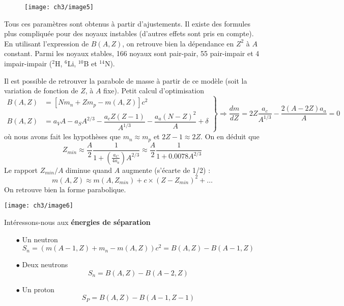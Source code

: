 	\begin{wrapfigure}[7]{l}{6cm}
	\vspace{-10mm}
	\texttt{[image: ch3/image5]}
	\end{wrapfigure}
Tous ces paramètres sont obtenus à partir d'ajustements. Il existe des formules plus compliquée pour des 
noyaux instables (d'autres effets sont pris en compte). En utilisant l'expression de $B(A,Z)$, on retrouve bien la dépendance en 
$Z^2$ à $A$ constant. Parmi les noyaux stables, 166 noyaux sont pair-pair, 55 pair-impair et 4 
impair-impair ($^2$H, $^6$Li, $^{10}$B et $^{14}$N).

\newpage
Il est possible de retrouver la parabole de masse à partir de ce modèle (soit la variation de fonction de $Z$, à
$A$ fixe). Petit calcul d'optimisation
\begin{equation}
\left.\begin{array}{ll}
B(A,Z) &= [Nm_n + Zm_p-m(A,Z)]c^2 \\
B(A,Z) &= a_VA - a_SA^{2/3}-\dfrac{a_cZ(Z-1)}{A^{1/3}}-\dfrac{a_a(N-Z)^2}{A}+\delta
\end{array}\right\} \Rightarrow 
\dfrac{dm}{dZ} = 2Z\frac{a_c}{A^{1/3}}-\dfrac{2(A-2Z)a_a}{A} = 0
\end{equation}
où nous avons fait les hypothèses que $m_n\approx m_p$ et $2Z-1\approx 2Z$. On en déduit que 
\begin{equation}
Z_{min} \approx \frac{A}{2}\dfrac{1}{1+\left(\frac{a_C}{4a_a}\right)A^{2/3}} \approx
\frac{A}{2}\dfrac{1}{1+0.0078A^{2/3}}
\end{equation}
Le rapport $Z_{min}/A$ diminue quand $A$ augmente (s'écarte de 1/2) :
\begin{equation}
m(A,Z) \approx m(A,Z_{min}) +c\times(Z-Z_{min})^2 + \dots
\end{equation}
On retrouve bien la forme parabolique. 
\begin{center}
	\texttt{[image: ch3/image6]}
\end{center}


Intéressons-nous aux \textbf{énergies de séparation}
\begin{itemize}
\item[$\bullet$] Un neutron
\begin{equation}
S_n = (m(A-1,Z)+m_n-m(A,Z))c^2 = B(A,Z)-B(A-1,Z)
\end{equation}
\item[$\bullet$] Deux neutrons
\begin{equation}
S_n =  B(A,Z)-B(A-2,Z)
\end{equation}
\item[$\bullet$] Un proton
\begin{equation}
S_P = B(A,Z) - B(A-1, Z-1)
\end{equation}
\end{itemize}\ 

